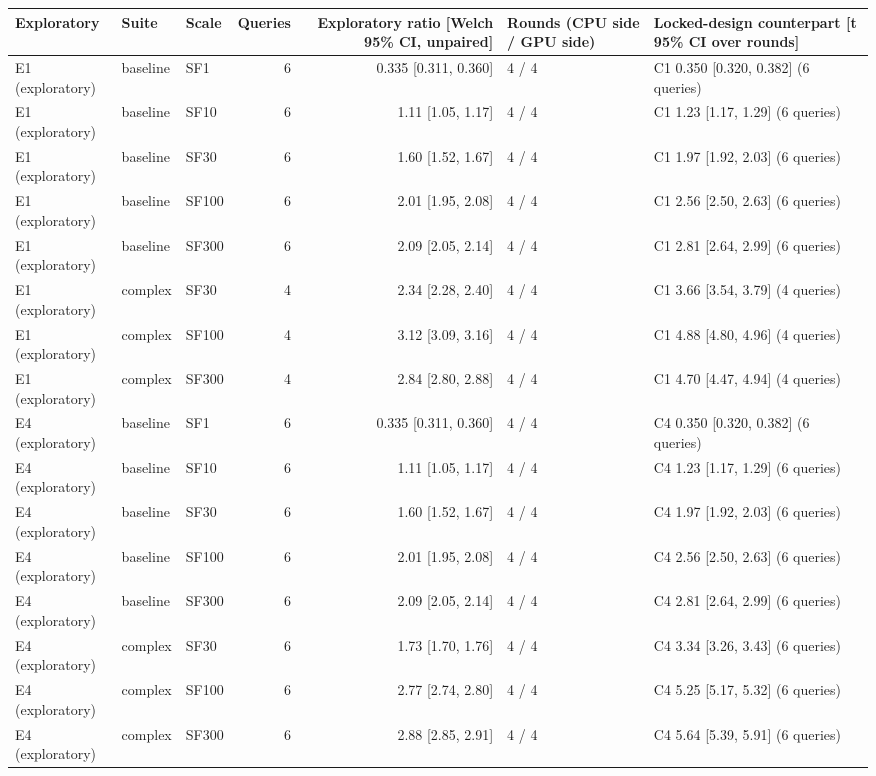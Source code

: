 \begin{longtable}{lllrrll}
\toprule
Exploratory & Suite & Scale & Queries & Exploratory ratio [Welch 95\% CI, unpaired] & Rounds (CPU side / GPU side) & Locked-design counterpart [t 95\% CI over rounds] \\
\midrule
\endhead
\bottomrule
\endfoot
E1 (exploratory) & baseline & SF1 & 6 & 0.335 [0.311, 0.360] & 4 / 4 & C1 0.350 [0.320, 0.382] (6 queries) \\
E1 (exploratory) & baseline & SF10 & 6 & 1.11 [1.05, 1.17] & 4 / 4 & C1 1.23 [1.17, 1.29] (6 queries) \\
E1 (exploratory) & baseline & SF30 & 6 & 1.60 [1.52, 1.67] & 4 / 4 & C1 1.97 [1.92, 2.03] (6 queries) \\
E1 (exploratory) & baseline & SF100 & 6 & 2.01 [1.95, 2.08] & 4 / 4 & C1 2.56 [2.50, 2.63] (6 queries) \\
E1 (exploratory) & baseline & SF300 & 6 & 2.09 [2.05, 2.14] & 4 / 4 & C1 2.81 [2.64, 2.99] (6 queries) \\
E1 (exploratory) & complex & SF30 & 4 & 2.34 [2.28, 2.40] & 4 / 4 & C1 3.66 [3.54, 3.79] (4 queries) \\
E1 (exploratory) & complex & SF100 & 4 & 3.12 [3.09, 3.16] & 4 / 4 & C1 4.88 [4.80, 4.96] (4 queries) \\
E1 (exploratory) & complex & SF300 & 4 & 2.84 [2.80, 2.88] & 4 / 4 & C1 4.70 [4.47, 4.94] (4 queries) \\
E4 (exploratory) & baseline & SF1 & 6 & 0.335 [0.311, 0.360] & 4 / 4 & C4 0.350 [0.320, 0.382] (6 queries) \\
E4 (exploratory) & baseline & SF10 & 6 & 1.11 [1.05, 1.17] & 4 / 4 & C4 1.23 [1.17, 1.29] (6 queries) \\
E4 (exploratory) & baseline & SF30 & 6 & 1.60 [1.52, 1.67] & 4 / 4 & C4 1.97 [1.92, 2.03] (6 queries) \\
E4 (exploratory) & baseline & SF100 & 6 & 2.01 [1.95, 2.08] & 4 / 4 & C4 2.56 [2.50, 2.63] (6 queries) \\
E4 (exploratory) & baseline & SF300 & 6 & 2.09 [2.05, 2.14] & 4 / 4 & C4 2.81 [2.64, 2.99] (6 queries) \\
E4 (exploratory) & complex & SF30 & 6 & 1.73 [1.70, 1.76] & 4 / 4 & C4 3.34 [3.26, 3.43] (6 queries) \\
E4 (exploratory) & complex & SF100 & 6 & 2.77 [2.74, 2.80] & 4 / 4 & C4 5.25 [5.17, 5.32] (6 queries) \\
E4 (exploratory) & complex & SF300 & 6 & 2.88 [2.85, 2.91] & 4 / 4 & C4 5.64 [5.39, 5.91] (6 queries) \\
\end{longtable}

